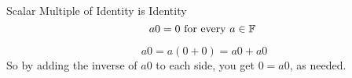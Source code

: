 \documentclass{standalone}
\begin{document}
\begin{theo*}{Scalar Multiple of Identity is Identity}
  \[
  a0 = 0 \text{ for every $ a \in \mathbb{F}$  } 
  \]
  \begin{pf}
    \[
     a 0 =  a \left( 0  +  0 \right) =  a0  +  a0
    \]
    So by adding the inverse of $ a0$ to each side, you get $ 0 =  a0$, as needed.
  \end{pf}
\end{theo*}
\end{document}
